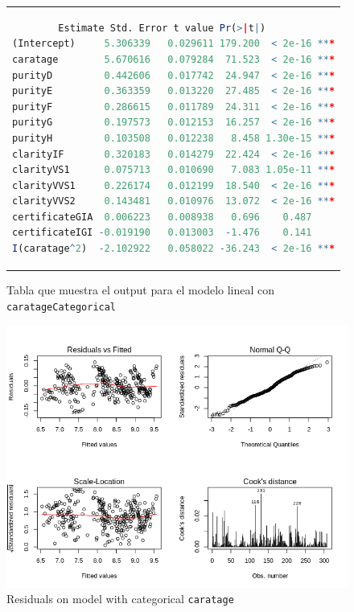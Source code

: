 \documentclass[a4paper, 7pt]{article}
\begin{document}
\begin{figure}[h!]
    \centering
    \begin{tabular}{c}
        \begin{lstlisting}[basicstyle=\tiny, language=r]
                Estimate Std. Error t value Pr(>|t|)    
(Intercept)     5.306339   0.029611 179.200  < 2e-16 ***
caratage        5.670616   0.079284  71.523  < 2e-16 ***
purityD         0.442606   0.017742  24.947  < 2e-16 ***
purityE         0.363359   0.013220  27.485  < 2e-16 ***
purityF         0.286615   0.011789  24.311  < 2e-16 ***
purityG         0.197573   0.012153  16.257  < 2e-16 ***
purityH         0.103508   0.012238   8.458 1.30e-15 ***
clarityIF       0.320183   0.014279  22.424  < 2e-16 ***
clarityVS1      0.075713   0.010690   7.083 1.05e-11 ***
clarityVVS1     0.226174   0.012199  18.540  < 2e-16 ***
clarityVVS2     0.143481   0.010976  13.072  < 2e-16 ***
certificateGIA  0.006223   0.008938   0.696    0.487    
certificateIGI -0.019190   0.013003  -1.476    0.141    
I(caratage^2)  -2.102922   0.058022 -36.243  < 2e-16 ***
        \end{lstlisting}
    \end{tabular}
    \caption{Tabla que muestra el output para el modelo lineal con \texttt{caratageCategorical}}
    \label{fig:summary_model1}
\end{figure}

\begin{figure}[h!]
    \centering
    \includegraphics[scale=0.5]{report/images/question-3/residuals-squared.png}
    \caption{Residuals on model with categorical \texttt{caratage}}
    \label{fig:my_label1}
\end{figure}
\end{document}
